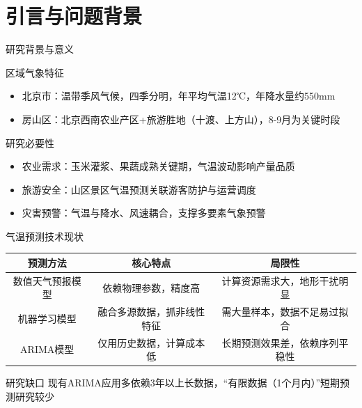 \section{引言与问题背景}
\begin{frame}{研究背景与意义}
    \begin{block}{区域气象特征}
        \begin{itemize}
            \item 北京市：温带季风气候，四季分明，年平均气温12℃，年降水量约550mm
            \item 房山区：北京西南农业产区+旅游胜地（十渡、上方山），8-9月为关键时段
        \end{itemize}
    \end{block}
    \begin{block}{研究必要性}
        \begin{itemize}
            \item 农业需求：玉米灌浆、果蔬成熟关键期，气温波动影响产量品质
            \item 旅游安全：山区景区气温预测关联游客防护与运营调度
            \item 灾害预警：气温与降水、风速耦合，支撑多要素气象预警
        \end{itemize}
    \end{block}
\end{frame}

\begin{frame}{气温预测技术现状}
    \centering
    \begin{tabular}{|c|c|c|}
        \hline
        预测方法 & 核心特点 & 局限性 \\
        \hline
        数值天气预报模型 & 依赖物理参数，精度高 & 计算资源需求大，地形干扰明显 \\
        \hline
        机器学习模型 & 融合多源数据，抓非线性特征 & 需大量样本，数据不足易过拟合 \\
        \hline
        ARIMA模型 & 仅用历史数据，计算成本低 & 长期预测效果差，依赖序列平稳性 \\
        \hline
    \end{tabular}
    \vspace{1em}
    \begin{block}{研究缺口}
        现有ARIMA应用多依赖3年以上长数据，“有限数据（1个月内）”短期预测研究较少
    \end{block}
\end{frame}

